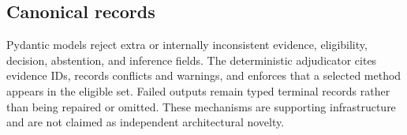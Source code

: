 \subsection{Canonical records}

Pydantic models reject extra or internally inconsistent evidence,
eligibility, decision, abstention, and inference fields.  The deterministic
adjudicator cites evidence IDs, records conflicts and warnings, and enforces
that a selected method appears in the eligible set.  Failed outputs remain
typed terminal records rather than being repaired or omitted.  These
mechanisms are supporting infrastructure and are not claimed as independent
architectural novelty.
